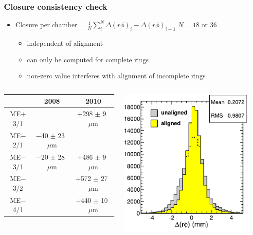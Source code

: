 \documentclass[compress]{beamer}
\begin{document}
\begin{frame}
\frametitle{Closure consistency check}

\begin{itemize}\setlength{\itemsep}{0.25 cm}
\item Closure per chamber = $\displaystyle \frac{1}{N} \sum_i^{N} \Delta (r\phi)_i - \Delta (r\phi)_{i+1}$ \hfill $N=18$ or $36$
\begin{itemize}
\item independent of alignment
\item can only be computed for complete rings
\item non-zero value interferes with alignment of incomplete rings
\end{itemize}
\end{itemize}

\vfill
\begin{columns}
\begin{tabular}{c c c}
\hline\hline
& \hspace{0.25 cm}2008\hspace{0.25 cm} & \hspace{0.25 cm}2010\hspace{0.25 cm} \\\hline
ME$+$3/1 &                       & $+$298 $\pm$ 9~$\mu$m \\
ME$-$2/1 & $-$40 $\pm$ 23~$\mu$m & \\
ME$-$3/1 & $-$20 $\pm$ 28~$\mu$m & $+$486 $\pm$ 9~$\mu$m \\
ME$-$3/2 &                       & $+$572 $\pm$ 27~$\mu$m \\
ME$-$4/1 &                       & $+$440 $\pm$ 10~$\mu$m \\\hline\hline
\end{tabular}
\includegraphics[width=\linewidth]{residuals2.pdf}
\end{columns}


\end{frame}
\end{document}
